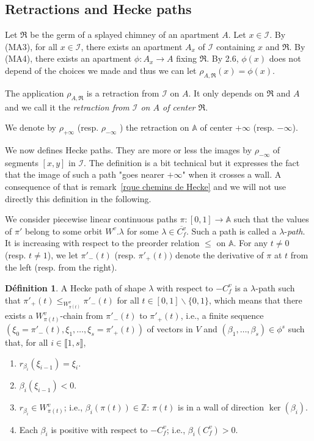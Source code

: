 \documentclass[12pt]{article}
\theoremstyle{plain}
\theoremstyle{definition}
\newtheorem{defn}[thm]{Définition}
\newcommand{\A}{\mathbb{A}}
\newcommand{\Z}{\mathbb{Z}}
\newcommand{\I}{\mathcal{I}}
\begin{document}
\subsection{Retractions and Hecke paths}


Let  $\mathfrak{R}$ be the germ of a splayed chimney of an apartment $A$. Let $x\in \I$. By (MA3), for all $x\in \I$, there exists an apartment $A_x$ of $\I$ containing $x$ and $\mathfrak{R}$. By (MA4), there exists an apartment $\phi:A_x\rightarrow A$ fixing $\mathfrak{R}$. By \cite{rousseau2011masures} 2.6, $\phi(x)$ does not depend of the choices we made and thus we can let $\rho_{A,\mathfrak{R}}(x)=\phi(x)$.

The application $\rho_{A,\mathfrak{R}}$ is a retraction from $\I$ on $A$. It only depends on $\mathfrak{R}$ and $A$ and we call it the \textit{retraction from $\I$ on $A$ of center $\mathfrak{R}$}. 

We denote by $\rho_{+\infty}$ (resp. $\rho_{-\infty}$ ) the retraction on $\A$ of center $+\infty$ (resp. $-\infty$).

We now defines Hecke paths. They are more or less the images by $\rho_{-\infty}$ of segments $[x,y]$ in $\I$. The definition is a bit technical but it expresses the fact that the image of such a path "goes nearer $+\infty$" when it crosses a wall. A consequence of that is remark~\ref{rque chemins de Hecke} and we will not use directly this definition in the following.

 We consider piecewise linear continuous paths $\pi:[0,1]\rightarrow \A$ such that the values  of $\pi'$ belong to some orbit $W^v.\lambda$ for some $\lambda\in \overline{C_f^v}$. Such a path is called a $\lambda$-\textit{path}. It is increasing with respect to the preorder relation $\leq$ on $\A$. For any $t\neq 0$ (resp. $t\neq 1$), we let $\pi'_-(t)$ (resp. $\pi'_+(t))$ denote the derivative of $\pi$ at $t$ from the left (resp. from the right).

\begin{defn}
A Hecke path of shape $\lambda$ with respect to $-C_f^v$ is a $\lambda$-path such that
 $\pi'_+(t)\leq_{W^v_{\pi (t)}} \pi'_-(t)$ for all $t\in [0,1]\backslash \{0,1\}$, which 
 means that there exists a $W_{\pi(t)}^v$-chain from $\pi'_-(t)$ to $\pi'_{+}(t)$, i.e., a 
 finite sequence $(\xi_0=\pi'_-(t),\xi_1,\ldots, \xi_s=\pi'_+(t))$ of vectors in $V$ and
  $(\beta_1,\ldots,\beta_s)\in \phi^s$ such that, for all $i\in \llbracket 1,s\rrbracket$,
\begin{enumerate}
\item $r_{\beta_i}(\xi_{i-1})=\xi_i.$

\item $\beta_i(\xi_{i-1})<0.$

\item $r_{\beta_i}\in W^v_{\pi(t)}$; i.e., $\beta_i(\pi(t))\in \Z$: $\pi(t)$ is in a wall of direction $\ker(\beta_i)$.

\item Each $\beta_i$ is positive with respect to $-C_f^v$; i.e., $\beta_i(C_f^v)>0$.
\end{enumerate}
\end{defn}
\end{document}
